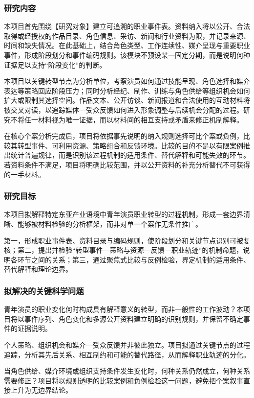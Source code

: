 \justifying
\NSFCBodyText

\subsubsection{研究内容}

本项目首先围绕【研究对象】建立可追溯的职业事件表。资料纳入将以公开、合法取得或经授权的作品目录、角色信息、采访、新闻和行业资料为限，并记录来源、时间和缺失情况。在此基础上，结合角色类型、工作连续性、媒介呈现与重要职业事件，形成阶段划分和事件编码规则。该模块不预设某一固定分期，而是说明何种证据足以支持“阶段变化”的判断。

本项目以关键转型节点为分析单位，考察演员如何通过技能呈现、角色选择和媒介表达等策略回应阶段压力；同时分析经纪、制作、训练与角色供给等组织机会如何扩大或限制其选择空间。作品文本、公开访谈、新闻报道和合法使用的互动材料将被交叉对读，以追踪媒体---受众反馈如何进入形象调整与后续机会分配的过程。研究不将任一材料视为唯一证据，而以材料间的相互支持或矛盾来修正机制解释。

在核心个案分析完成后，项目将依据事先说明的纳入规则选择可比个案或负例，比较其转型事件、可利用资源、策略组合和反馈环境。比较的目的不是以有限案例推出统计普遍规律，而是识别该过程机制的适用条件、替代解释和可能失效的环节。若资料条件不满足，项目将明确比较范围，并以公开资料的补充分析替代不可获得的一手材料。

\subsubsection{研究目标}

本项目拟解释特定东亚产业语境中青年演员职业转型的过程机制，形成一套边界清晰、能够被材料检验的分析框架，而非对单一个案作无条件推广。

第一，形成职业事件表、资料目录与编码规则，使阶段划分和关键节点识别可被复核；第二，提出并检验“转型事件---策略与资源---反馈---职业轨迹”的机制命题，说明各环节之间的关系；第三，通过聚焦式比较与反例检验，界定机制的适用条件、替代解释和理论边界。

\subsubsection{拟解决的关键科学问题}

青年演员的职业变化何时构成具有解释意义的转型，而非一般性的工作波动？本项目将以事件序列、角色变化和多源公开资料建立明确的识别规则，并保留不确定事件的证据说明。

个人策略、组织机会和媒介---受众反馈并非彼此独立。项目拟通过关键节点的过程追踪，分析其先后关系、相互制约和可能的替代路径，从而解释职业轨迹的分化。

当角色供给、媒介环境或组织支持条件发生变化时，何种关系仍然成立，何种关系需要修正？项目将以规则透明的比较案例和负例检验这一问题，避免把个案叙事直接上升为无边界结论。
